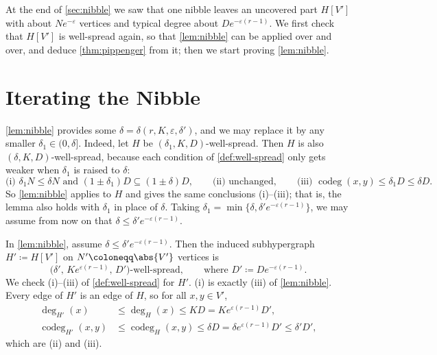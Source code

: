 
At the end of \autoref{sec:nibble} we saw that one nibble leaves an uncovered part \(H[V']\) with about \(N e^{-\varepsilon}\) vertices and typical degree about \(D e^{-\varepsilon(r-1)}\). We first check that \(H[V']\) is well-spread again, so that \autoref{lem:nibble} can be applied over and over, and deduce \autoref{thm:pippenger} from it; then we start proving \autoref{lem:nibble}.

\section{Iterating the Nibble}\label{sec:pippenger-proof}

\autoref{lem:nibble} provides some \(\delta = \delta(r,K,\varepsilon,\delta')\), and we may replace it by any smaller \(\delta_{1} \in (0, \delta]\). Indeed, let \(H\) be \((\delta_{1}, K, D)\)-well-spread. Then \(H\) is also \((\delta, K, D)\)-well-spread, because each condition of \autoref{def:well-spread} only gets weaker when \(\delta_{1}\) is raised to \(\delta\):
\[
    \text{(i) } \delta_{1} N \le \delta N \text{ and } (1 \pm \delta_{1}) D \subseteq (1 \pm \delta) D,
    \qquad
    \text{(ii) unchanged},
    \qquad
    \text{(iii) } \operatorname{codeg}(x,y) \le \delta_{1} D \le \delta D .
\]
So \autoref{lem:nibble} applies to \(H\) and gives the same conclusions (i)--(iii); that is, the lemma also holds with \(\delta_{1}\) in place of \(\delta\). Taking \(\delta_{1} = \min\{\delta, \delta' e^{-\varepsilon(r-1)}\}\), we may assume from now on that \(\delta \le \delta' e^{-\varepsilon(r-1)}\).

\begin{remark}\label{rmk:nibble-well-spread}
    In \autoref{lem:nibble}, assume \(\delta \le \delta' e^{-\varepsilon(r-1)}\). Then the induced subhypergraph \(H' \coloneqq H[V']\) on \(N' \coloneqq \abs{V'}\) vertices is
    \[
        \bigl( \delta',\, K e^{\varepsilon(r-1)},\, D' \bigr)\text{-well-spread},
        \qquad\text{where } D' \coloneqq D e^{-\varepsilon(r-1)} .
    \]
    We check (i)--(iii) of \autoref{def:well-spread} for \(H'\). (i) is exactly (iii) of \autoref{lem:nibble}. Every edge of \(H'\) is an edge of \(H\), so for all \(x, y \in V'\),
    \[
        \begin{aligned}
            \deg_{H'}(x) &\le \deg_{H}(x) \le K D = K e^{\varepsilon(r-1)} D', \\
            \operatorname{codeg}_{H'}(x,y) &\le \operatorname{codeg}_{H}(x,y) \le \delta D = \delta e^{\varepsilon(r-1)} D' \le \delta' D',
        \end{aligned}
    \]
    which are (ii) and (iii).
\end{remark}

